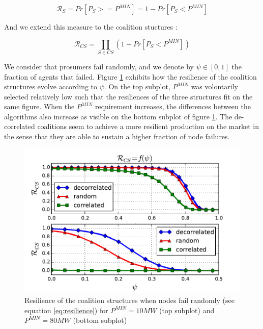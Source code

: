 \documentclass[conference]{IEEEtran}
\begin{document}
\begin{equation}
\mathcal{R}_{S} = Pr[P_{S} >= P^{MIN}] = 1 - Pr[P_{S} < P^{MIN}]
\end{equation}

And we extend this measure to the coalition stuctures :

\begin{equation}
\mathcal{R}_{CS} = \prod_{S \in CS} \left( 1 - Pr[ P_{S} < P^{MIN} ] \right)
\label{eq:resilience}
\end{equation}

We consider that prosumers fail randomly, and we denote by $ \psi \in [0,1] $ the fraction of agents that failed. Figure \ref{fig:resilience} exhibits how the resilience of the coalition structures evolve according to $ \psi $. On the top subplot, $ P^{MIN} $ was volontarily selected relatively low such that the resiliences of the three structures fit on the same figure. When the $ P^{MIN} $ requirement increases, the differences between the algorithms also increase as visible on the bottom subplot of figure \ref{fig:resilience}. The de-correlated coalitions seem to achieve a more resilient production on the market in the sense that they are able to sustain a higher fraction of node failures.

\begin{figure}
\includegraphics[scale=.6]{./figures/resilience_both}
\caption{Resilience of the coalition structures when nodes fail randomly (see equation \ref{eq:resilience}) for $ P^{MIN} = 10MW $ (top subplot) and $ P^{MIN} = 80MW $ (bottom subplot) }
\label{fig:resilience}
\end{figure}
\end{document}
